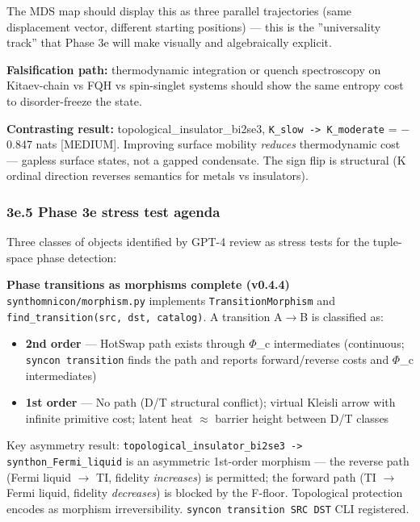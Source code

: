 \documentclass[12pt,a4paper]{article}
\begin{document}
The MDS map should display this as three parallel trajectories (same displacement vector, different starting positions) --- this is the ''universality track'' that Phase 3e will make visually and algebraically explicit.

\textbf{Falsification path:} thermodynamic integration or quench spectroscopy on Kitaev-chain vs FQH vs spin-singlet systems should show the same entropy cost to disorder-freeze the state.

\textbf{Contrasting result:} topological\_insulator\_bi2se3, \texttt{K\_slow -\textgreater{} K\_moderate} = $-$0.847 nats {[}MEDIUM{]}. Improving surface mobility \emph{reduces} thermodynamic cost --- gapless surface states, not a gapped condensate. The sign flip is structural (K ordinal direction reverses semantics for metals vs insulators).

\subsubsection{3e.5 Phase 3e stress test agenda}

Three classes of objects identified by GPT-4 review as stress tests for the tuple-space phase detection:

\textbf{Phase transitions as morphisms  complete (v0.4.4)}
\texttt{synthomnicon/morphism.py} implements \texttt{TransitionMorphism} and \texttt{find\_transition(src, dst, catalog)}. A transition A$\rightarrow$B is classified as:

\begin{itemize}
    \item \textbf{2nd order} --- HotSwap path exists through $\Phi$\_c intermediates (continuous; \texttt{syncon transition} finds the path and reports forward/reverse costs and $\Phi$\_c intermediates)
    \item \textbf{1st order} --- No path (D/T structural conflict); virtual Kleisli arrow with infinite primitive cost; latent heat $\approx$ barrier height between D/T classes
\end{itemize}

Key asymmetry result: \texttt{topological\_insulator\_bi2se3 -\textgreater{} synthon\_Fermi\_liquid} is an asymmetric 1st-order morphism --- the reverse path (Fermi liquid $\rightarrow$ TI, fidelity \emph{increases}) is permitted; the forward path (TI $\rightarrow$ Fermi liquid, fidelity \emph{decreases}) is blocked by the F-floor. Topological protection encodes as morphism irreversibility. \texttt{syncon transition SRC DST} CLI registered.
\end{document}
